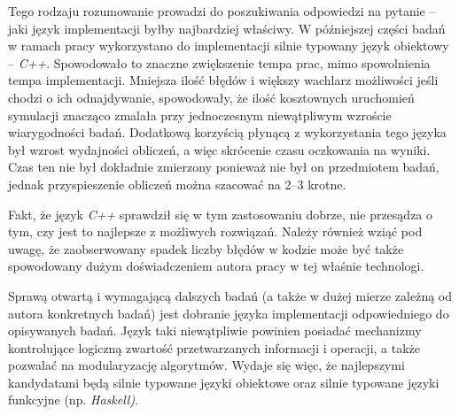 \documentclass[12pt,a4paper]{report}
\begin{document}
{{{{{{{}
\par{
Tego rodzaju rozumowanie prowadzi do poszukiwania odpowiedzi na pytanie -- jaki język implementacji byłby najbardziej właściwy. W późniejszej części badań w ramach pracy wykorzystano do implementacji silnie typowany język obiektowy -- \emph{C++}. Spowodowało to znaczne zwiększenie tempa prac, mimo spowolnienia tempa implementacji. Mniejsza ilość błędów i większy wachlarz możliwości jeśli chodzi o ich odnajdywanie, spowodowały, że ilość kosztownych uruchomień symulacji znacząco zmalała przy jednoczesnym niewątpliwym wzroście wiarygodności badań. Dodatkową korzyścią płynącą z wykorzystania tego języka był wzrost wydajności obliczeń, a więc skrócenie czasu oczkowania na wyniki. Czas ten nie był dokładnie zmierzony ponieważ nie był on przedmiotem badań, jednak przyspieszenie obliczeń można szacować na 2--3 krotne.
}
\par{
Fakt, że język \emph{C++} sprawdził się w tym zastosowaniu dobrze, nie przesądza o tym, czy jest to najlepsze z możliwych rozwiązań. Należy również wziąć pod uwagę, że zaobserwowany spadek liczby błędów w kodzie może być także spowodowany dużym doświadczeniem autora pracy w tej właśnie technologi.
}
\par{
Sprawą otwartą i wymagającą dalszych badań (a także w dużej mierze zależną od autora konkretnych badań) jest dobranie języka implementacji odpowiedniego do opisywanych badań. Język taki niewątpliwie powinien posiadać mechanizmy kontrolujące logiczną zwartość przetwarzanych informacji i operacji, a także pozwalać na modularyzację algorytmów. Wydaje się więc, że najlepszymi kandydatami będą silnie typowane języki obiektowe oraz silnie typowane języki funkcyjne (np. \emph{Haskell)}.
}
}}}}}}
\end{document}
